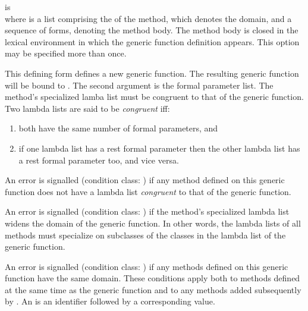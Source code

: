 \begin{optDefinition}
\begin{arguments}
    \item[\scref{level-0-init-option}] is   \\
    where  is a list comprising the
     of the method, which denotes the domain, and
    a sequence of forms, denoting the method body.  The method body is closed in
    the lexical environment in which the generic function definition
    appears. This option may be specified more than once.
\end{arguments}
%
\remarks%
This defining form defines a new generic function.  The resulting
generic function will be bound to .  The second argument
is the formal parameter list.  The method's specialized lamba list
must be congruent to that of the generic function.  Two lambda lists
are said to be {\em congruent\/} iff:
%
\begin{enumerate}
    \item  both have the same number of formal parameters, and
    \item  if one lambda list has a rest formal parameter then the other
    lambda list has a rest formal parameter too, and vice versa.
\end{enumerate}
%
An error is signalled (condition class:
) if any method defined on this
generic function does not have a lambda list {\em congruent\/} to that of the
generic function.

An error is signalled (condition class:
) if the method's specialized lambda
list widens the domain of the generic function.  In other words, the lambda
lists of all methods must specialize on subclasses of the classes in the lambda
list of the generic function.

An error is signalled (condition class: 
) if any methods defined on this generic
function have the same domain.  These conditions apply both to methods defined
at the same time as the generic function and to any methods added subsequently
by .  An  is an identifier followed by a
corresponding value.


\end{optDefinition}
